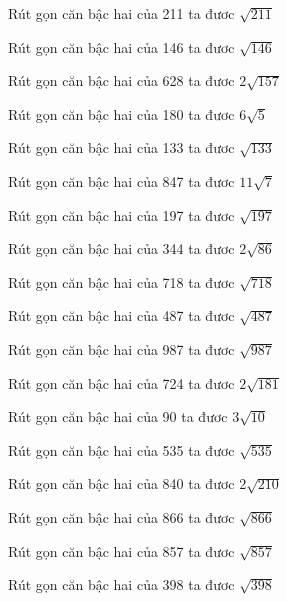 \documentclass[12pt,a4paper]{article}
\begin{document}
\begin{ex}
Rút gọn căn bậc hai của 211 ta đươc $\sqrt{211}$
\end{ex}
\begin{ex}
Rút gọn căn bậc hai của 146 ta đươc $\sqrt{146}$
\end{ex}
\begin{ex}
Rút gọn căn bậc hai của 628 ta đươc $2\sqrt{157}$
\end{ex}
\begin{ex}
Rút gọn căn bậc hai của 180 ta đươc $6\sqrt{5}$
\end{ex}
\begin{ex}
Rút gọn căn bậc hai của 133 ta đươc $\sqrt{133}$
\end{ex}
\begin{ex}
Rút gọn căn bậc hai của 847 ta đươc $11\sqrt{7}$
\end{ex}
\begin{ex}
Rút gọn căn bậc hai của 197 ta đươc $\sqrt{197}$
\end{ex}
\begin{ex}
Rút gọn căn bậc hai của 344 ta đươc $2\sqrt{86}$
\end{ex}
\begin{ex}
Rút gọn căn bậc hai của 718 ta đươc $\sqrt{718}$
\end{ex}
\begin{ex}
Rút gọn căn bậc hai của 487 ta đươc $\sqrt{487}$
\end{ex}
\begin{ex}
Rút gọn căn bậc hai của 987 ta đươc $\sqrt{987}$
\end{ex}
\begin{ex}
Rút gọn căn bậc hai của 724 ta đươc $2\sqrt{181}$
\end{ex}
\begin{ex}
Rút gọn căn bậc hai của 90 ta đươc $3\sqrt{10}$
\end{ex}
\begin{ex}
Rút gọn căn bậc hai của 535 ta đươc $\sqrt{535}$
\end{ex}
\begin{ex}
Rút gọn căn bậc hai của 840 ta đươc $2\sqrt{210}$
\end{ex}
\begin{ex}
Rút gọn căn bậc hai của 866 ta đươc $\sqrt{866}$
\end{ex}
\begin{ex}
Rút gọn căn bậc hai của 857 ta đươc $\sqrt{857}$
\end{ex}
\begin{ex}
Rút gọn căn bậc hai của 398 ta đươc $\sqrt{398}$
\end{ex}
\end{document}
